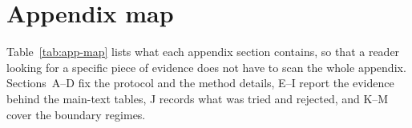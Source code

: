 \documentclass{article}
\newcommand{\ph}[1]{\textcolor{phgray}{\textsf{[\detokenize{#1}]}}}
\begin{document}






\appendix

\newpage



\section*{Appendix map}
\label{app:map}
Table~\ref{tab:app-map} lists what each appendix section contains, so that a reader looking
for a specific piece of evidence does not have to scan the whole appendix. Sections~A--D fix
the protocol and the method details, E--I report the evidence behind the main-text tables,
J records what was tried and rejected, and K--M cover the boundary regimes.
\end{document}
